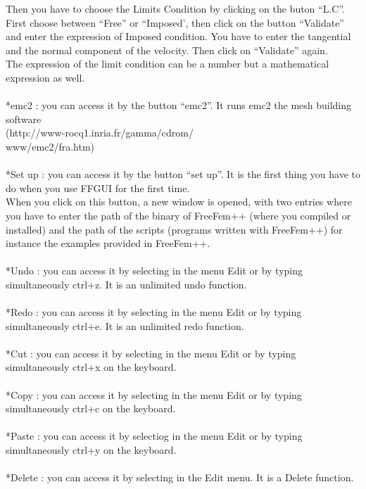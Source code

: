 \documentclass[a4paper]{report}
\begin{document}
Then you have to choose the Limits Condition by clicking on the buton ``L.C''.\\
First choose between ``Free'' or ``Imposed', then click on the button ``Validate'' and enter the expression of Imposed condition. You have to enter the tangential and the normal component of the velocity. Then click on ``Validate'' again.\\
The expression of the limit condition can be a number but a mathematical expression as well.\\
\\
*emc2 : you can access it by the button ``emc2''. It runs emc2 the mesh building software \\
(http://www-rocq1.inria.fr/gamma/cdrom/\\
www/emc2/fra.htm)\\
\\
*Set up : you can access it by the button ``set up''. It is the first thing you have to do when you use FFGUI for the first time.\\
When you click on this button, a new window is opened, with two entries where you have to enter the path of the binary of FreeFem++ (where you compiled or installed) and the path of the scripts (programs written with FreeFem++) for instance the examples provided in FreeFem++.\\
\\
*Undo : you can access it by selecting in the menu Edit or by typing simultaneously ctrl+z. It is an unlimited undo function.\\
\\
*Redo : you can access it by selecting in the menu Edit or by typing simultaneously ctrl+e. It is an unlimited redo function.\\
\\
*Cut : you can access it by selecting in the menu Edit or by typing simultaneously ctrl+x on the keyboard.\\
\\
*Copy : you can access it by selecting in the menu Edit or by typing simultaneously ctrl+c on the keyboard.\\
\\
*Paste : you can access it by selectiog in the menu Edit or by typing simultaneously ctrl+y on the keyboard.\\
\\
*Delete : you can access it by selecting in the Edit menu. It is a Delete function.\\
\\
\end{document}
